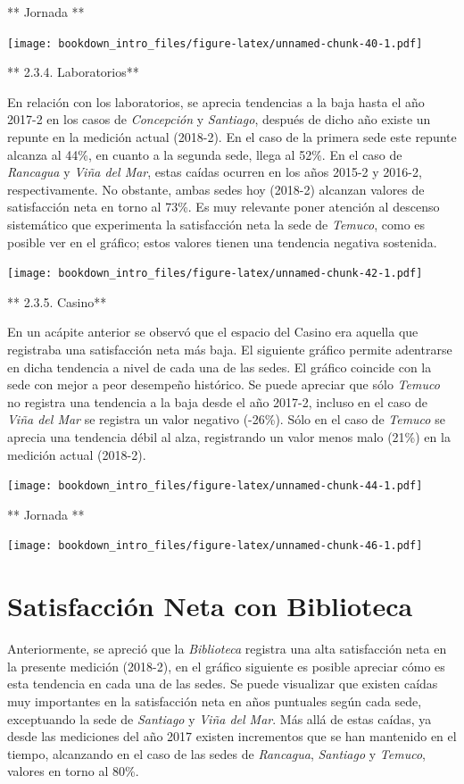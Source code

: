 \documentclass[]{book}
\begin{document}
** Jornada **

\texttt{[image: bookdown\_intro\_files/figure-latex/unnamed-chunk-40-1.pdf]}

** 2.3.4. Laboratorios**

En relación con los laboratorios, se aprecia tendencias a la baja hasta
el año 2017-2 en los casos de \emph{Concepción} y \emph{Santiago},
después de dicho año existe un repunte en la medición actual (2018-2).
En el caso de la primera sede este repunte alcanza al 44\%, en cuanto a
la segunda sede, llega al 52\%. En el caso de \emph{Rancagua} y
\emph{Viña del Mar}, estas caídas ocurren en los años 2015-2 y 2016-2,
respectivamente. No obstante, ambas sedes hoy (2018-2) alcanzan valores
de satisfacción neta en torno al 73\%. Es muy relevante poner atención
al descenso sistemático que experimenta la satisfacción neta la sede de
\emph{Temuco}, como es posible ver en el gráfico; estos valores tienen
una tendencia negativa sostenida.

\texttt{[image: bookdown\_intro\_files/figure-latex/unnamed-chunk-42-1.pdf]}

** 2.3.5. Casino**

En un acápite anterior se observó que el espacio del Casino era aquella
que registraba una satisfacción neta más baja. El siguiente gráfico
permite adentrarse en dicha tendencia a nivel de cada una de las sedes.
El gráfico coincide con la sede con mejor a peor desempeño histórico. Se
puede apreciar que sólo \emph{Temuco} no registra una tendencia a la
baja desde el año 2017-2, incluso en el caso de \emph{Viña del Mar} se
registra un valor negativo (-26\%). Sólo en el caso de \emph{Temuco} se
aprecia una tendencia débil al alza, registrando un valor menos malo
(21\%) en la medición actual (2018-2).

\texttt{[image: bookdown\_intro\_files/figure-latex/unnamed-chunk-44-1.pdf]}

** Jornada **

\texttt{[image: bookdown\_intro\_files/figure-latex/unnamed-chunk-46-1.pdf]}

\section{Satisfacción Neta con
Biblioteca}\label{satisfaccion-neta-con-biblioteca}

Anteriormente, se apreció que la \emph{Biblioteca} registra una alta
satisfacción neta en la presente medición (2018-2), en el gráfico
siguiente es posible apreciar cómo es esta tendencia en cada una de las
sedes. Se puede visualizar que existen caídas muy importantes en la
satisfacción neta en años puntuales según cada sede, exceptuando la sede
de \emph{Santiago} y \emph{Viña del Mar}. Más allá de estas caídas, ya
desde las mediciones del año 2017 existen incrementos que se han
mantenido en el tiempo, alcanzando en el caso de las sedes de
\emph{Rancagua}, \emph{Santiago} y \emph{Temuco}, valores en torno al
80\%.
\end{document}
